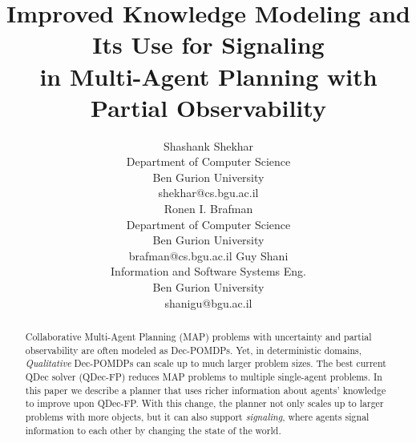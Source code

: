 \documentclass[letterpaper]{article} %
\theoremstyle{definition}
\begin{document}
\title{Improved Knowledge Modeling and Its Use for Signaling\\ in Multi-Agent Planning with Partial Observability}

\author{
    Shashank Shekhar\\
    Department of Computer Science\\
    Ben Gurion University\\
    shekhar@cs.bgu.ac.il\\
    \And
    Ronen I. Brafman\\
    Department of Computer Science\\
    Ben Gurion University\\
    brafman@cs.bgu.ac.il
    \And
    Guy Shani\\
    Information and Software Systems Eng.\\
    Ben Gurion University\\
    shanigu@bgu.ac.il
}

\maketitle

\begin{abstract}
Collaborative Multi-Agent Planning (MAP)
problems with uncertainty and partial observability 
are often modeled as Dec-POMDPs. Yet, 
in deterministic domains, {\em Qualitative} 
Dec-POMDPs can scale up to much larger problem sizes. 
The best current QDec solver 
(QDec-FP) 
reduces MAP problems to multiple single-agent problems. 
In this paper we describe a planner that uses richer information about agents' knowledge to improve upon QDec-FP.
With this change, the planner not only scales up to larger problems with more objects, but it can also support 
{\em signaling}, where agents signal information to each other by changing the state of the world.
\end{abstract}
\end{document}
